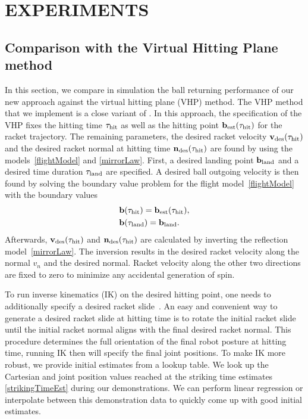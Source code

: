 \section{EXPERIMENTS}\label{results}

\subsection{Comparison with the Virtual Hitting Plane method}

In this section, we compare in simulation the ball returning performance of our new approach against the virtual hitting plane (VHP) method. The VHP method that we implement is a close variant of \cite{Muelling13}. In this approach, the specification of the VHP fixes the hitting time $\tau_{\mathrm{hit}}$ as well as the hitting point $\boldsymbol{\mathrm{b}}_{\mathrm{est}}(\tau_{\mathrm{hit}})$ for the racket trajectory. The remaining parameters, the desired racket velocity $\boldsymbol{\mathrm{v}}_{\mathrm{des}}(\tau_{\mathrm{hit}})$ and the desired racket normal at hitting time $\boldsymbol{\mathrm{n}}_{\mathrm{des}}(\tau_{\mathrm{hit}})$ are found by using the models~\eqref{flightModel} and \eqref{mirrorLaw}. First, a desired landing point $\boldsymbol{\mathrm{b}}_{\mathrm{land}}$ and a desired time duration $\tau_{\mathrm{land}}$ are specified. A desired ball outgoing velocity is then found by solving the boundary value problem for the flight model~\eqref{flightModel} with the boundary values
%
\begin{align}
&\boldsymbol{\mathrm{b}}(\tau_{\mathrm{hit}}) = \boldsymbol{\mathrm{b}}_{\mathrm{est}}(\tau_{\mathrm{hit}}), \\
&\boldsymbol{\mathrm{b}}(\tau_{\mathrm{land}}) = \boldsymbol{\mathrm{b}}_{\mathrm{land}}.
\label{bvp}
\end{align}
%
Afterwards, $\boldsymbol{\mathrm{v}}_{\mathrm{des}}(\tau_{\mathrm{hit}})$ and $\boldsymbol{\mathrm{n}}_{\mathrm{des}}(\tau_{\mathrm{hit}})$ are calculated by inverting the reflection model~\eqref{mirrorLaw}. The inversion results in the desired racket velocity along the normal $v_n$ and the desired normal. Racket velocity along the other two directions are fixed to zero to minimize any accidental generation of spin.

To run inverse kinematics (IK) on the desired hitting point, one needs to additionally specify a desired racket slide~\cite{Spong06}. An easy and convenient way to generate a desired racket slide at hitting time is to rotate the initial racket slide until the initial racket normal aligns with the final desired racket normal. This procedure determines the full orientation of the final robot posture at hitting time, running IK then will specify the final joint positions. To make IK more robust, we provide initial estimates from a lookup table. We look up the Cartesian and joint position values reached at the striking time estimates \eqref{strikingTimeEst} during our demonstrations. We can perform linear regression or interpolate between this demonstration data to quickly come up with good initial estimates.

